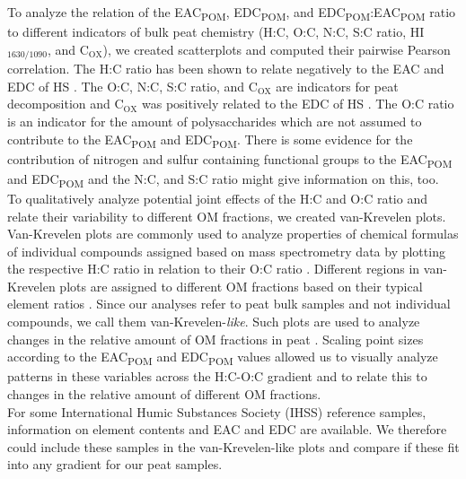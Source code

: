 \documentclass[alpha-refs, lineno]{wiley-article-rmd}
\begin{document}
To analyze the relation of the EAC\textsubscript{POM}, EDC\textsubscript{POM}, and EDC\textsubscript{POM}:EAC\textsubscript{POM} ratio to different indicators of bulk peat chemistry (H:C, O:C, N:C, S:C ratio, HI\(_\text{1630/1090}\), and C\(_\text{OX}\)), we created scatterplots and computed their pairwise Pearson correlation. The H:C ratio has been shown to relate negatively to the EAC and EDC of HS \autocite{Aeschbacher.2010,Tan.2017,Lv.2018}. The O:C, N:C, S:C ratio, and C\(_\text{OX}\) are indicators for peat decomposition \autocite{Masiello.2008,Biester.2014,Leifeld.2012} and C\(_\text{OX}\) was positively related to the EDC of HS \autocite{Lv.2018}. The O:C ratio is an indicator for the amount of polysaccharides \autocite{Kim.2003} which are not assumed to contribute to the EAC\textsubscript{POM} and EDC\textsubscript{POM}. There is some evidence for the contribution of nitrogen and sulfur containing functional groups to the EAC\textsubscript{POM} and EDC\textsubscript{POM} \autocite{Ratasuk.2007,Fimmen.2007,HernandezMontoya.2012} and the N:C, and S:C ratio might give information on this, too.\\
To qualitatively analyze potential joint effects of the H:C and O:C ratio and relate their variability to different OM fractions, we created van-Krevelen plots.
Van-Krevelen plots are commonly used to analyze properties of chemical formulas of individual compounds assigned based on mass spectrometry data by plotting the respective H:C ratio in relation to their O:C ratio \autocite{Kim.2003}. Different regions in van-Krevelen plots are assigned to different OM fractions based on their typical element ratios \autocite{Kim.2003}. Since our analyses refer to peat bulk samples and not individual compounds, we call them van-Krevelen-\emph{like}. Such plots are used to analyze changes in the relative amount of OM fractions in peat \autocite{Leifeld.2012,Bader.2018}. Scaling point sizes according to the EAC\textsubscript{POM} and EDC\textsubscript{POM} values allowed us to visually analyze patterns in these variables across the H:C-O:C gradient and to relate this to changes in the relative amount of different OM fractions.\\
For some International Humic Substances Society (IHSS) reference samples, information on element contents \autocite{HuffmanLaboratories.NA} and EAC and EDC \autocite{Aeschbacher.2012} are available. We therefore could include these samples in the van-Krevelen-like plots and compare if these fit into any gradient for our peat samples.
\end{document}
